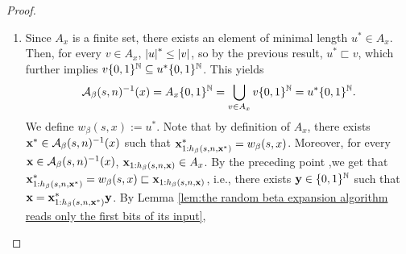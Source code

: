 \begin{proof}
\begin{enumerate}[label = (\alph*)]
        Therefore, $\vf$ is such that there exists $\yf \in \{0,1\}^\N$ satisfying $\vf = \uf_{1:h_\beta(s,n_i,\uf)} \yf$, so we can apply Lemma \ref{lem:the random beta expansion algorithm reads only the first bits of its input}. In particular,
        \begin{align}
            i-1 \overset{(a)}{=} h_\beta(s,n_i,\uf) &= h_\beta(s,n_i,\vf)\\
            r_i := \pi_1 K_\beta^{n_i}(s,\uf) &= \pi_1 K_\beta^{n_i}(s,\vf) \in S_\beta\\
            \pi_2 K_\beta^{n_i}(s,\uf) &= \sigma^{i-1}(\uf)\\
            \pi_2 K_\beta^{n_i}(s,\vf) &= \sigma^{i-1}(\vf).
        \end{align}
        where (a) follows by $n_i \in \SM_\beta(s,n_i,\uf)$. This further implies that 
        \begin{equation}
            \left[ \AM_\beta(s,n)(\uf)\right]_{n_i} = \tilde T_\beta\left( K_\beta^{n_i}(s,\uf)\right) = \tilde T_\beta \left( r_i, \sigma^{i-1}(\uf) \right) = \left[\sigma^{i-1}(\uf) \right]_i = \uf_i,
        \end{equation}
        and 
        \begin{equation}
            \left[ \AM_\beta(s,n)(\vf)\right]_{n_i} = \tilde T_\beta\left( K_\beta^{n_i}(s,\vf)\right) = \tilde T_\beta \left( r_i, \sigma^{i-1}(\vf) \right) = \left[\sigma^{i-1}(\vf) \right]_i = \vf_i.
        \end{equation}
        Since $\uf_i \neq \vf_i$, we get $\AM_\beta(s,n)(\uf) \neq \AM_\beta(s,n)(\vf)$, which is a contraction, since $\uf, \vf \in \AM_\beta(s,n)^{-1}(x)$. Therefore, $u \sqsubset v$.
        \item Since $A_x$ is a finite set, there exists an element of minimal length $u^\ast \in A_x$. Then, for every $v \in A_x$, $\left| u \right|^\ast \leq \left| v \right|$, so by the previous result, $u^\ast \sqsubset v$, which further implies $v \{0,1\}^{\mathbb{N}} \subseteq u^\ast \{0,1\}^{\mathbb{N}}$. This yields
        \begin{equation}
            \mathcal{A}_\beta(s,n)^{-1}(x) = A_x \{0,1\}^{\mathbb{N}} = \bigcup_{v \in A_x} v \{0,1\}^{\mathbb{N}} = u^\ast \{0,1\}^{\mathbb{N}}.
        \end{equation}
        We define $w_\beta(s,x) := u^\ast$. Note that by definition of $A_x$, there exists ${\bf x}^\ast \in \mathcal{A}_\beta(s,n)^{-1}(x)$ such that ${\bf x}^\ast_{1:h_\beta(s,n,{\bf x}^\ast)} = w_\beta(s,x)$. Moreover, for every ${\bf x} \in \mathcal{A}_\beta(s,n)^{-1}(x)$, ${\bf x}_{1:h_\beta(s,n,{\bf x})} \in A_x$. By the preceding point ,we get that ${\bf x}^\ast_{1:h_\beta(s,n,{\bf x}^\ast)} = w_\beta(s,x) \sqsubset {\bf x}_{1:h_\beta(s,n,{\bf x})}$, i.e., there exists $\yf \in \{0,1\}^\N$ such that ${\bf x} = {\bf x}^\ast_{1:h_\beta(s,n,{\bf x}^\ast)} {\bf y}$. By Lemma \ref{lem:the random beta expansion algorithm reads only the first bits of its input},

\end{enumerate}
\end{proof}
